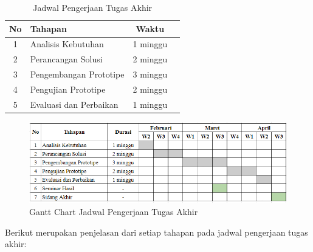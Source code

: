 \begin{table}[h]
	\caption{Jadwal Pengerjaan Tugas Akhir}
	\vspace{0.25cm}
	\begin{center}
		\begin{tabular}{|c|l|c|l|}
			\hline
			\textbf{No} & \textbf{Tahapan}       & \textbf{Waktu} \\ \hline
			1           & Analisis Kebutuhan     & 1 minggu       \\ \hline
			2           & Perancangan Solusi     & 2 minggu       \\ \hline
			3           & Pengembangan Prototipe & 3 minggu       \\ \hline
			4           & Pengujian Prototipe    & 2 minggu       \\ \hline
			5           & Evaluasi dan Perbaikan & 1 minggu       \\ \hline
		\end{tabular}
	\end{center}
\end{table}

\begin{figure}[ht]
	\centering
	\includegraphics[width=1\textwidth]{resources/chapter-4/gantt-chart.png}
	\caption{Gantt Chart Jadwal Pengerjaan Tugas Akhir}
	\label{image:gantt-chart}
\end{figure}

Berikut merupakan penjelasan dari setiap tahapan pada jadwal pengerjaan tugas akhir:

